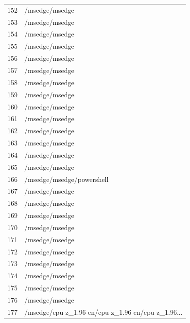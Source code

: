 \documentclass[a4paper,twoside,12pt]{book}
\begin{document}
\begin{appendices}
\begin{table}
\begin{tabular}{ll}
		152 &                                     /msedge/msedge \\
		153 &                                     /msedge/msedge \\
		154 &                                     /msedge/msedge \\
		155 &                                     /msedge/msedge \\
		156 &                                     /msedge/msedge \\
		157 &                                     /msedge/msedge \\
		158 &                                     /msedge/msedge \\
		159 &                                     /msedge/msedge \\
		160 &                                     /msedge/msedge \\
		161 &                                     /msedge/msedge \\
		162 &                                     /msedge/msedge \\
		163 &                                     /msedge/msedge \\
		164 &                                     /msedge/msedge \\
		165 &                                     /msedge/msedge \\
		166 &                          /msedge/msedge/powershell \\
		167 &                                     /msedge/msedge \\
		168 &                                     /msedge/msedge \\
		169 &                                     /msedge/msedge \\
		170 &                                     /msedge/msedge \\
		171 &                                     /msedge/msedge \\
		172 &                                     /msedge/msedge \\
		173 &                                     /msedge/msedge \\
		174 &                                     /msedge/msedge \\
		175 &                                     /msedge/msedge \\
		176 &                                     /msedge/msedge \\
		177 &  /msedge/cpu-z\_1.96-en/cpu-z\_1.96-en/cpu-z\_1.96... \\

\end{tabular}
\end{table}
\end{appendices}
\end{document}
